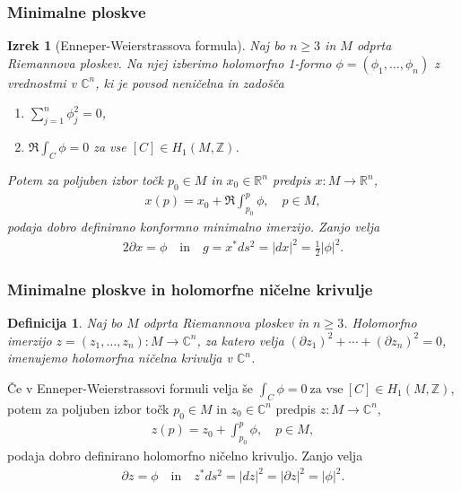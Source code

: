 \documentclass[9pt, table]{beamer}
\newtheorem{izrek}{Izrek}
\newtheorem{definicija}{Definicija}
\newcommand{\R}{\mathbb R}
\newcommand{\Z}{\mathbb Z}
\newcommand{\C}{\mathbb C}
\begin{document}
\begin{frame}
\frametitle{Minimalne ploskve}

\begin{izrek}[Enneper-Weierstrassova formula]
Naj bo $n \geq 3$ in $M$ odprta Riemannova ploskev. Na njej izberimo holomorfno 1-formo $\phi = (\phi_{1}, \dots , \phi_{n})$ z vrednostmi v $\C^{n}$, ki je povsod neničelna in zadošča 
\begin{enumerate}
\item $ \sum_{j=1}^{n} \phi_{j}^{2} = 0$,
\item $ \Re \int_{C} \phi = 0 $ za vse $[C] \in H_{1} (M, \Z)$.
\end{enumerate}
Potem za poljuben izbor točk $p_0 \in M$ in $x_0 \in \R^{n}$ predpis $x \colon M \to \R^{n}$,
\begin{align}
x(p) = x_0 + \Re \int_{p_0}^{p} \phi, \quad p \in M,
\end{align}
podaja dobro definirano konformno minimalno imerzijo. Zanjo velja
\begin{align}
2 \partial{x} = \phi \quad \text{in} \quad g = x^{*} ds^2 = |dx|^2 = \frac{1}{2} |\phi|^2.
\end{align}
\end{izrek}

\end{frame}


\begin{frame}
\frametitle{Minimalne ploskve in holomorfne ničelne krivulje}

\begin{definicija}
Naj bo $M$ odprta Riemannova ploskev in $n \geq 3$. Holomorfno imerzijo $z = (z_{1}, \dots , z_{n}) \colon M \to \C^{n}$, za katero velja
$(\partial{z_{1}})^2 + \cdots + (\partial{z_{n}})^2 = 0$, imenujemo {\color{blue} holomorfna ničelna krivulja} v $\C^{n}$.
\end{definicija}
\pause

Če v Enneper-Weierstrassovi formuli velja še
$ \int_{C} \phi = 0 \ \text{za vse} \ [C] \in H_{1} (M, \Z) $,
potem za poljuben izbor točk $p_0 \in M$ in $z_0 \in \C^{n}$ predpis $z \colon M \to \C^{n}$,
\begin{align}
z(p) = z_0 + \int_{p_0}^{p} \phi, \quad p \in M,
\end{align}
podaja dobro definirano holomorfno ničelno krivuljo. Zanjo velja
\begin{align}
\partial{z} = \phi \quad \text{in} \quad z^{*} ds^2 = |dz|^2 = |\partial{z}|^2 = |\phi|^2.
\end{align}

\end{frame}
\end{document}
